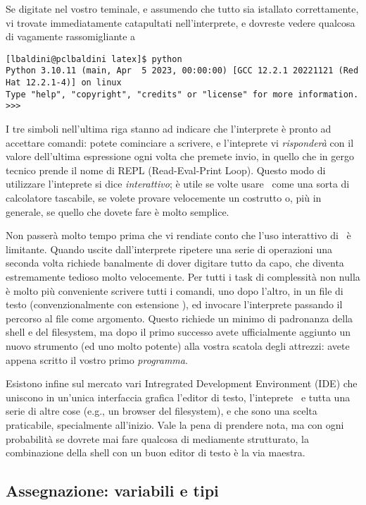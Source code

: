 Se digitate  nel vostro teminale, e assumendo che tutto sia istallato
correttamente, vi trovate immediatamente catapultati nell'interprete, e dovreste
vedere qualcosa di vagamente rassomigliante a
\begin{verbatim}
[lbaldini@pclbaldini latex]$ python
Python 3.10.11 (main, Apr  5 2023, 00:00:00) [GCC 12.2.1 20221121 (Red Hat 12.2.1-4)] on linux
Type "help", "copyright", "credits" or "license" for more information.
>>>
\end{verbatim}
I tre simboli \cchar{>>>} nell'ultima riga stanno ad indicare che l'interprete \`e
pronto ad accettare comandi: potete cominciare a scrivere, e l'inteprete vi \emph{risponder\`a}
con il valore dell'ultima espressione ogni volta che premete invio, in quello che
in gergo tecnico prende il nome di REPL (Read-Eval-Print Loop). Questo modo di
utilizzare l'inteprete si dice \emph{interattivo}; \`e utile se volte usare \python\
come una sorta di calcolatore tascabile, se volete provare velocemente un costrutto o,
pi\`u in generale, se quello che dovete fare \`e molto semplice.

Non passer\`a molto tempo prima che vi rendiate conto che l'uso interattivo di \python\
\`e limitante. Quando uscite dall'interprete ripetere una serie di operazioni
una seconda volta richiede banalmente di dover digitare tutto da capo, che diventa
estremamente tedioso molto velocemente. Per tutti i task di complessit\`a non nulla
\`e molto pi\`u conveniente scrivere tutti i comandi, uno dopo l'altro, in un file
di testo (convenzionalmente con estensione \cchar{.py}), ed invocare l'interprete
passando il percorso al file come argomento. Questo richiede un minimo di padronanza
della shell e del filesystem, ma dopo il primo successo avete ufficialmente aggiunto
un nuovo strumento (ed uno molto potente) alla vostra scatola degli attrezzi: avete
appena scritto il vostro primo \emph{programma}.

Esistono infine sul mercato vari Intregrated Development Environment (IDE) che uniscono
in un'unica interfaccia grafica l'editor di testo, l'inteprete \python\ e tutta una
serie di altre cose (e.g., un browser del filesystem), e che sono una scelta praticabile,
specialmente all'inizio. Vale la pena di prendere nota, ma con ogni probabilit\`a
se dovrete mai fare qualcosa di mediamente strutturato, la combinazione della shell
con un buon editor di testo \`e la via maestra.


\subsection{Assegnazione: variabili e tipi}

